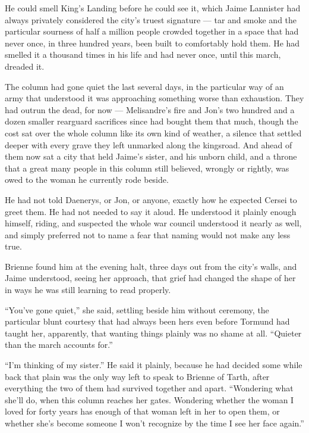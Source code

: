 He could smell King’s Landing before he could see it, which Jaime Lannister had always privately considered the city’s truest signature — tar and smoke and the particular sourness of half a million people crowded together in a space that had never once, in three hundred years, been built to comfortably hold them. He had smelled it a thousand times in his life and had never once, until this march, dreaded it.

The column had gone quiet the last several days, in the particular way of an army that understood it was approaching something worse than exhaustion. They had outrun the dead, for now — Melisandre’s fire and Jon’s two hundred and a dozen smaller rearguard sacrifices since had bought them that much, though the cost sat over the whole column like its own kind of weather, a silence that settled deeper with every grave they left unmarked along the kingsroad. And ahead of them now sat a city that held Jaime’s sister, and his unborn child, and a throne that a great many people in this column still believed, wrongly or rightly, was owed to the woman he currently rode beside.

He had not told Daenerys, or Jon, or anyone, exactly how he expected Cersei to greet them. He had not needed to say it aloud. He understood it plainly enough himself, riding, and suspected the whole war council understood it nearly as well, and simply preferred not to name a fear that naming would not make any less true.

\sceneBreak

Brienne found him at the evening halt, three days out from the city’s walls, and Jaime understood, seeing her approach, that grief had changed the shape of her in ways he was still learning to read properly.

“You’ve gone quiet,” she said, settling beside him without ceremony, the particular blunt courtesy that had always been hers even before Tormund had taught her, apparently, that wanting things plainly was no shame at all. “Quieter than the march accounts for.”

“I’m thinking of my sister.” He said it plainly, because he had decided some while back that plain was the only way left to speak to Brienne of Tarth, after everything the two of them had survived together and apart. “Wondering what she’ll do, when this column reaches her gates. Wondering whether the woman I loved for forty years has enough of that woman left in her to open them, or whether she’s become someone I won’t recognize by the time I see her face again.”

